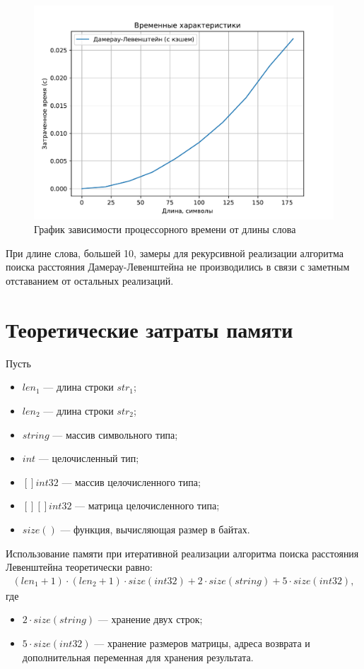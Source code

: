 \begin{figure}[H]
	\centering
	\includegraphics{assets/plots/cpu-cache.pdf}
	\caption{График зависимости процессорного времени от длины слова}
	\label{plt:cpu-cache}
\end{figure}

При длине слова, большей 10, замеры для рекурсивной реализации алгоритма поиска расстояния Дамерау-Левенштейна не производились в связи с заметным отставанием от остальных реализаций.


\section{Теоретические затраты памяти}

Пусть
\begin{itemize}
	\item $len_{1}$ --- длина строки $str_{1}$;
	\item $len_{2}$ --- длина строки $str_{2}$;
	\item $string$ --- массив символьного типа;
	\item $int$ --- целочисленный тип;
	\item $[]int32$ --- массив целочисленного типа;
	\item $[][]int32$ --- матрица целочисленного типа;
	\item $size()$ --- функция, вычисляющая размер в байтах.
\end{itemize}

Использование памяти при итеративной реализации алгоритма поиска расстояния Левенштейна теоретически равно:
\begin{equation}
	\begin{aligned}
		(len_{1} + 1) \cdot (len_{2} + 1) \cdot size(int32) + 2 \cdot size(string) + 5 \cdot size(int32),
	\end{aligned}
\end{equation}
где 
\begin{itemize}
	\item $2 \cdot size(string)$ --- хранение двух строк;
	\item $5 \cdot size(int32)$ --- хранение размеров матрицы, адреса возврата и дополнительная переменная для хранения результата.
\end{itemize}

